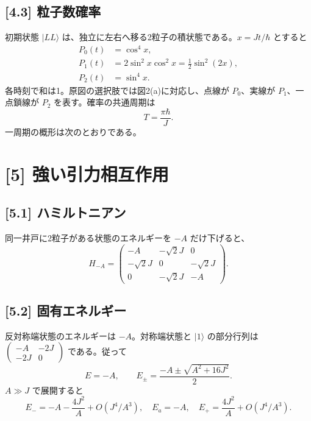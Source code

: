 \documentclass[11pt,a4paper]{article}
\begin{document}
\subsection*{[4.3] 粒子数確率}
初期状態 $|LL\rangle$ は、独立に左右へ移る2粒子の積状態である。$x=Jt/\hbar$ とすると
\begin{align}
 P_0(t)&=\cos^4x,\\
 P_1(t)&=2\sin^2x\cos^2x=\frac12\sin^2(2x),\\
 P_2(t)&=\sin^4x.
\end{align}
各時刻で和は1。原図の選択肢では図2(a)に対応し、点線が $P_0$、実線が $P_1$、一点鎖線が $P_2$ を表す。確率の共通周期は
\begin{equation}
 \boxed{T=\frac{\pi\hbar}{J}}.
\end{equation}
一周期の概形は次のとおりである。
\begin{center}
\end{center}

\section*{[5] 強い引力相互作用}
\subsection*{[5.1] ハミルトニアン}
同一井戸に2粒子がある状態のエネルギーを $-A$ だけ下げると、
\begin{equation}
 \boxed{H_{-A}=\begin{pmatrix}
 -A&-\sqrt2J&0\\-\sqrt2J&0&-\sqrt2J\\0&-\sqrt2J&-A
 \end{pmatrix}.}
\end{equation}
\subsection*{[5.2] 固有エネルギー}
反対称端状態のエネルギーは $-A$。対称端状態と $|1\rangle$ の部分行列は
$\begin{pmatrix}-A&-2J\\-2J&0\end{pmatrix}$ である。従って
\begin{equation}
 E=-A,\qquad E_\pm=\frac{-A\pm\sqrt{A^2+16J^2}}2.
\end{equation}
$A\gg J$ で展開すると
\begin{equation}
 \boxed{E_-=-A-\frac{4J^2}{A}+O(J^4/A^3),\quad
 E_a=-A,\quad E_+=\frac{4J^2}{A}+O(J^4/A^3).}
\end{equation}
\end{document}
